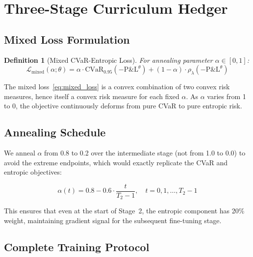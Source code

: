 \documentclass[11pt]{article}
\newtheorem{definition}[theorem]{Definition}
\newcommand{\cvar}{\mathrm{CVaR}}
\begin{document}
\section{Three-Stage Curriculum Hedger}
\label{sec:method}

\subsection{Mixed Loss Formulation}

\begin{definition}[Mixed CVaR-Entropic Loss]
For annealing parameter $\alpha \in [0, 1]$:
\begin{equation}
    \mathcal{L}_{\mathrm{mixed}}(\alpha; \theta) = \alpha \cdot \cvar_{0.95}(-\mathrm{P\&L}^\theta) + (1-\alpha) \cdot \rho_\lambda(-\mathrm{P\&L}^\theta)
    \label{eq:mixed_loss}
\end{equation}
\end{definition}

The mixed loss~\eqref{eq:mixed_loss} is a convex combination of two convex risk measures, hence itself a convex risk measure for each fixed $\alpha$. As $\alpha$ varies from 1 to 0, the objective continuously deforms from pure CVaR to pure entropic risk.

\subsection{Annealing Schedule}

We anneal $\alpha$ from 0.8 to 0.2 over the intermediate stage (not from 1.0 to 0.0) to avoid the extreme endpoints, which would exactly replicate the CVaR and entropic objectives:

\begin{equation}
    \alpha(t) = 0.8 - 0.6 \cdot \frac{t}{T_2 - 1}, \quad t = 0, 1, \ldots, T_2 - 1
\end{equation}

This ensures that even at the start of Stage~2, the entropic component has 20\% weight, maintaining gradient signal for the subsequent fine-tuning stage.

\subsection{Complete Training Protocol}
\end{document}

